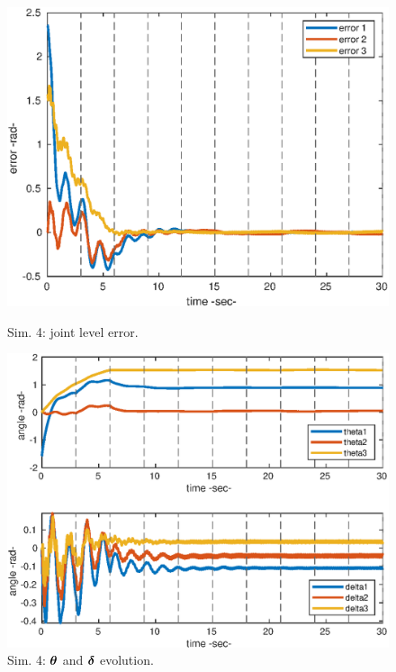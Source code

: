 \begin{center}
\begin{figure}[h!]
\begin{minipage}[h!]{0.45\linewidth}
\begin{center}
\hspace{-0.1cm}\includegraphics[scale=0.52]{figures/3_1_error.eps}
\caption{\label{4_e} Sim. 4: joint level error.}
\vspace{1cm}
\includegraphics[scale=0.52]{figures/3_1_thetadelta.eps}
\caption{\label{4_qt}Sim. 4: $\boldsymbol{\theta}$ and $\boldsymbol{\delta}$ evolution.}
\vspace{1cm}

\end{center}
\end{minipage}
\end{figure}
\end{center}
